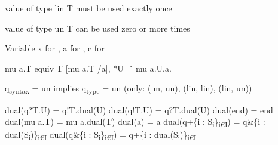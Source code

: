 \documentclass[landscape, a4paper]{article}
\begin{document}
\begin{minipage}[t]{0.195\linewidth}
	\raggedright

	\begin{betterlist}
		\item {} value of type lin T must be used exactly once
		\item {} value of type un T can be used zero or more times
		\item Variable x for , a for , c for 
		\item mu a.T equiv T [mu a.T /a], *U \^= mu a.U.a.
		\item q\textsubscript{syntax} = un implies q\textsubscript{type} = un (only: {(un, un), (lin, lin), (lin, un)})
		\item {}
		\begin{betterlist}
			\item dual(q?T.U) = q!T.dual(U) \quad dual(q!T.U) = q?T.dual(U) \quad dual(end) = end \quad dual(mu a.T) = mu a.dual(T) \quad dual(a) = a \quad dual(q+\{i : S\textsubscript{i}\}\textsubscript{i€I}) = q\&\{i : dual(S\textsubscript{i})\}\textsubscript{i€I} \quad dual(q\&\{i : S\textsubscript{i}\}\textsubscript{i€I}) = q+\{i : dual(S\textsubscript{i})\}\textsubscript{i€I}
		\end{betterlist}
		\item {}
		\vspace{-0.25cm}


\end{betterlist}
\end{minipage}
\end{document}
